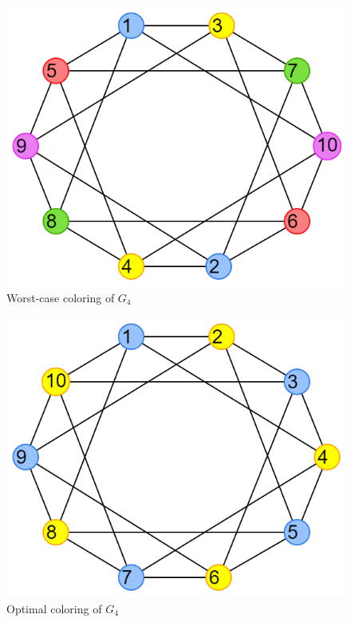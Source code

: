 \documentclass{article}
\theoremstyle{definition}
\begin{document}
\begin{multicols}{2}
  \begin{figure}[H]
  \centering
  \includegraphics[scale=0.38]{images/graph-5.png}
  \caption{Worst-case coloring of \(G_4\)}\label{fig:ex4-colored}
  \end{figure}

  \begin{figure}[H]
  \centering
  \includegraphics[scale=0.38]{images/graph-6.png}
  \caption{Optimal coloring of \(G_4\)}\label{fig:ex4-optimal}
  \end{figure}
\end{multicols}
\end{document}
